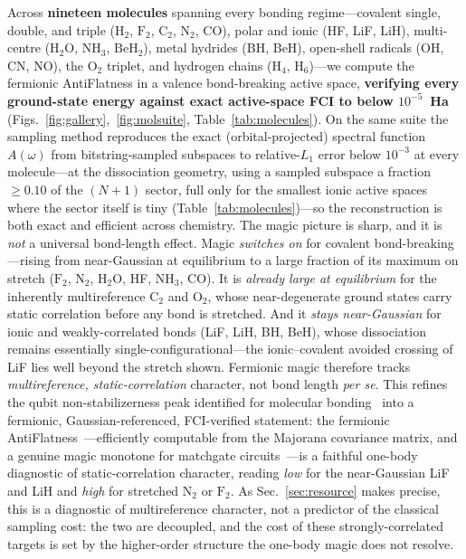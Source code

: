 Across \textbf{nineteen molecules} spanning every bonding regime---covalent single, double, and triple
($\mathrm{H_2}$, $\mathrm{F_2}$, $\mathrm{C_2}$, $\mathrm{N_2}$, CO), polar and ionic (HF, LiF, LiH),
multi-centre ($\mathrm{H_2O}$, $\mathrm{NH_3}$, $\mathrm{BeH_2}$), metal hydrides (BH, BeH), open-shell
radicals (OH, CN, NO), the $\mathrm{O_2}$ triplet, and hydrogen chains ($\mathrm{H_4}$,
$\mathrm{H_6}$)---we compute the fermionic AntiFlatness in a valence bond-breaking active space,
\textbf{verifying every ground-state energy against exact active-space FCI to below $10^{-5}$~Ha}
(Figs.~\ref{fig:gallery},~\ref{fig:molsuite}, Table~\ref{tab:molecules}). On the same suite the sampling method reproduces
the exact (orbital-projected) spectral function $A(\omega)$ from bitstring-sampled subspaces to
relative-$L_1$ error below $10^{-3}$ at every molecule---at the dissociation geometry, using a sampled
subspace a fraction $\ge0.10$ of the $(N{+}1)$ sector, full only for the smallest ionic active spaces
where the sector itself is tiny (Table~\ref{tab:molecules})---so the
reconstruction is both exact and efficient across chemistry. The magic picture is sharp, and it is
\emph{not} a universal bond-length effect. Magic \emph{switches on} for covalent bond-breaking---rising from
near-Gaussian at equilibrium to a large fraction of its maximum on stretch ($\mathrm{F_2}$,
$\mathrm{N_2}$, $\mathrm{H_2O}$, HF, $\mathrm{NH_3}$, CO). It is \emph{already large at equilibrium} for
the inherently multireference $\mathrm{C_2}$ and $\mathrm{O_2}$, whose near-degenerate ground states
carry static correlation before any bond is stretched. And it \emph{stays near-Gaussian} for ionic and
weakly-correlated bonds (LiF, LiH, BH, BeH), whose dissociation remains essentially
single-configurational---the ionic--covalent avoided crossing of LiF lies well beyond the
stretch shown. Fermionic magic therefore tracks \emph{multireference, static-correlation} character,
not bond length \emph{per se}. This refines the qubit non-stabilizerness peak identified for molecular
bonding~\cite{sarkis2025} into a fermionic, Gaussian-referenced, FCI-verified statement: the fermionic
AntiFlatness~\cite{sierant2026,tarabunga2026}---efficiently computable from the Majorana covariance
matrix, and a genuine magic monotone for matchgate circuits~\cite{hebenstreit2019}---is a faithful
one-body diagnostic of static-correlation character, reading \emph{low} for the near-Gaussian LiF and
LiH and \emph{high} for stretched $\mathrm{N_2}$ or $\mathrm{F_2}$. As Sec.~\ref{sec:resource} makes
precise, this is a diagnostic of multireference character, not a predictor of the classical sampling
cost: the two are decoupled, and the cost of these strongly-correlated targets is set by the
higher-order structure the one-body magic does not resolve.

